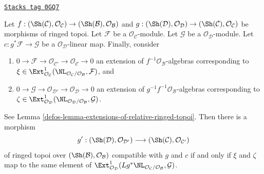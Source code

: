 \begin{lemma}
\label{defos-lemma-extensions-of-relative-ringed-topoi-functorial}
\href{https://stacks.math.columbia.edu/tag/0GQ7}{\texttt{Stacks tag 0GQ7}}

Let $f : (\Sh(\mathcal{C}), \mathcal{O}_\mathcal{C}) \to
(\Sh(\mathcal{B}), \mathcal{O}_\mathcal{B})$ and
$g : (\Sh(\mathcal{D}), \mathcal{O}_\mathcal{D}) \to
(\Sh(\mathcal{C}), \mathcal{O}_\mathcal{C})$ be morphisms
of ringed topoi. Let $\mathcal{F}$ be a $\mathcal{O}_\mathcal{C}$-module.
Let $\mathcal{G}$ be a $\mathcal{O}_\mathcal{D}$-module. Let
$c : g^*\mathcal{F} \to \mathcal{G}$ be a $\mathcal{O}_\mathcal{D}$-linear
map. Finally, consider
\begin{enumerate}
\item[(a)]
$0 \to \mathcal{F} \to \mathcal{O}_{\mathcal{C}'} \to
\mathcal{O}_\mathcal{C} \to 0$
an extension of $f^{-1}\mathcal{O}_\mathcal{B}$-algebras
corresponding to
$\xi \in \Ext^1_{\mathcal{O}_\mathcal{C}}(
\NL_{\mathcal{O}_\mathcal{C}/\mathcal{O}_\mathcal{B}}, \mathcal{F})$, and
\item[(b)]
$0 \to \mathcal{G} \to \mathcal{O}_{\mathcal{D}'} \to
\mathcal{O}_\mathcal{D} \to 0$
an extension of $g^{-1}f^{-1}\mathcal{O}_\mathcal{B}$-algebras
corresponding to
$\zeta \in \Ext^1_{\mathcal{O}_\mathcal{D}}(
\NL_{\mathcal{O}_\mathcal{D}/\mathcal{O}_\mathcal{B}}, \mathcal{G})$.
\end{enumerate}
See Lemma \ref{defos-lemma-extensions-of-relative-ringed-topoi}.
Then there is a morphism
$$
g' :
(\Sh(\mathcal{D}), \mathcal{O}_{\mathcal{D}'})
\longrightarrow
(\Sh(\mathcal{C}), \mathcal{O}_{\mathcal{C}'})
$$
of ringed topoi over $(\Sh(\mathcal{B}), \mathcal{O}_\mathcal{B})$
compatible with $g$ and $c$ if and only if $\xi$ and $\zeta$
map to the same element of
$\Ext^1_{\mathcal{O}_\mathcal{D}}(
Lg^*\NL_{\mathcal{O}_\mathcal{C}/\mathcal{O}_\mathcal{B}}, \mathcal{G})$.
\end{lemma}


